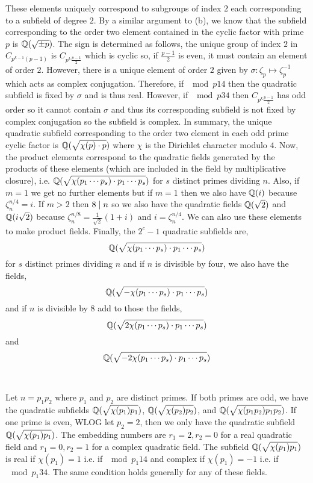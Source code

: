 \documentclass[12pt]{extarticle}
\begin{document}
\begin{enumerate}
\begin{enumerate}
These elements uniquely correspond to subgroups of index $2$ each corresponding to a subfield of degree $2$. By a similar argument to (b), we know that the subfield corresponding to the order two element contained in the cyclic factor with prime $p$ is $\mathbb{Q}(\sqrt{\pm p})$. The sign is determined as follows, the unique group of index $2$ in $C_{p^{k - 1} (p - 1)}$ is $C_{p^k \frac{p-1}{2}}$ which is cyclic so, if $\frac{p-1}{2}$ is even, it must contain an element of order $2$. However, there is a unique element of order $2$ given by $\sigma : \zeta_p \mapsto \zeta_p^{-1}$ which acts as complex conjugation. Therefore, if $\mod{p}{1}{4}$ then the quadratic subfield is fixed by $\sigma$ and is thus real. However, if $\mod{p}{3}{4}$ then $C_{p^k \frac{p-1}{2}}$ has odd order so it cannot contain $\sigma$ and thus its corresponding subfield is not fixed by complex conjugation so the subfield is complex. In summary, the unique quadratic subfield corresponding to the order two element in each odd prime cyclic factor is $\mathbb{Q} \small(\sqrt{\chi(p) \cdot p} \small)$ where $\chi$ is the Dirichlet character modulo $4$. Now, the product elements correspond to the quadratic fields generated by the products of these elements (which are included in the field by multiplicative closure), i.e. $\mathbb{Q} \small(\sqrt{\chi(p_1 \cdots p_s) \cdot p_1 \cdots p_s} \small)$ for $s$ distinct primes dividing $n$. Also, if $m = 1$ we get no further elements but if $m = 1$ then we also have $\mathbb{Q}(i)$ because $\zeta_n^{n/4} = i$. If $m > 2$ then $8 \mid n$ so we also have the quadratic fields $\mathbb{Q} \small(\sqrt{2} \small)$ and $\mathbb{Q}(i \sqrt{2})$ because $\zeta_n^{n/8} = \frac{1}{\sqrt{2}} (1 + i)$ and $i = \zeta_n^{n / 4}$. We can also use these elements to make product fields. Finally, the $2^c - 1$ quadratic subfields are, \[\mathbb{Q} \small(\sqrt{\chi(p_1 \cdots p_s) \cdot p_1 \cdots p_s} \small)\]   
for $s$ distinct primes dividing $n$ and if $n$ is divisible by four, we also have the fields, \[\mathbb{Q} \small(\sqrt{-\chi(p_1 \cdots p_s) \cdot p_1 \cdots p_s} \small)\] and if $n$ is divisible by $8$ add to those the fields, \[\mathbb{Q} \small(\sqrt{2 \chi(p_1 \cdots p_s) \cdot p_1 \cdots p_s} \small)\] 
and \[\mathbb{Q} \small(\sqrt{-2 \chi(p_1 \cdots p_s) \cdot p_1 \cdots p_s} \small)\] \\ \\

Let $n = p_1 p_2$ where $p_1$ and $p_2$ are distinct primes. If both primes are odd, we have the quadratic subfields $\mathbb{Q} \small(\sqrt{\chi(p_1) p_1} \small)$, $\mathbb{Q} \small(\sqrt{\chi(p_2) p_2} \small)$, and $\mathbb{Q} \small(\sqrt{\chi(p_1 p_2) p_1 p_2} \small)$. If one prime is even, WLOG let $p_2 = 2$, then we only have the quadratic subfield $\mathbb{Q} \small(\sqrt{\chi(p_1) p_1} \small)$. The embedding numbers are $r_1 = 2, r_2 = 0$ for a real quadratic field and $r_1 = 0, r_2 = 1$ for a complex quadratic field. The subfield $\mathbb{Q} \small(\sqrt{\chi(p_1) p_1} \small)$ is real if $\chi(p_1) = 1$ i.e. if $\mod{p_1}{1}{4}$ and complex if $\chi(p_1) = -1$ i.e. if $\mod{p_1}{3}{4}$. The same condition holds generally for any of these fields.    
\end{enumerate}


\end{enumerate}
\end{document}
